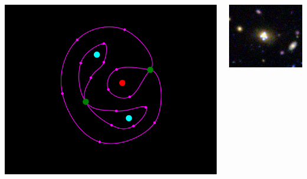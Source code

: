 \documentclass[aspectratio=1610]{beamer}
\begin{document}
\begin{frame}
  \begin{columns}[T]
    \begin{column}{5.5cm}
      \includegraphics[width=\textwidth]{imgs/sl-1}
    \end{column}
    \begin{column}{5.5cm}
      \includegraphics[width=\textwidth]{imgs/real1}
    \end{column}
  \end{columns}
\end{frame}
\end{document}
